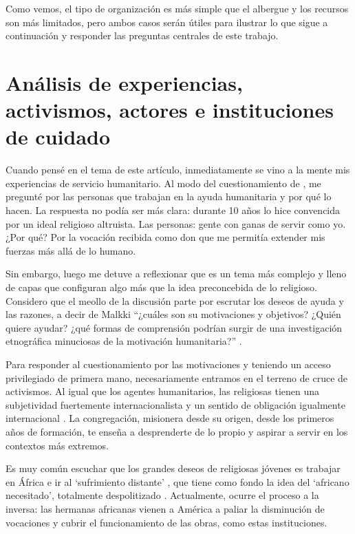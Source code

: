 \documentclass[
  spanish,
  11pt,
  a4paper,
]{scrbook}
\begin{document}
Como vemos, el tipo de organización es más simple que el albergue y los
recursos son más limitados, pero ambos casos serán útiles para ilustrar
lo que sigue a continuación y responder las preguntas centrales de este
trabajo.

\section*{Análisis de experiencias, activismos, actores e instituciones
de
cuidado}\label{anuxe1lisis-de-experiencias-activismos-actores-e-instituciones-de-cuidado}


Cuando pensé en el tema de este artículo, inmediatamente se vino a la
mente mis experiencias de servicio humanitario. Al modo del
cuestionamiento de \textcite{Malkki2015}, me pregunté por las personas
que trabajan en la ayuda humanitaria y por qué lo hacen. La respuesta no
podía ser más clara: durante 10 años lo hice convencida por un ideal
religioso altruista. Las personas: gente con ganas de servir como yo.
¿Por qué? Por la vocación recibida como don que me permitía extender mis
fuerzas más allá de lo humano.

Sin embargo, luego me detuve a reflexionar que es un tema más complejo y
lleno de capas que configuran algo más que la idea preconcebida de lo
religioso. Considero que el meollo de la discusión parte por escrutar
los deseos de ayuda y las razones, a decir de Malkki ``¿cuáles son su
motivaciones y objetivos? ¿Quién quiere ayudar? ¿qué formas de
comprensión podrían surgir de una investigación etnográfica minuciosas
de la motivación humanitaria?'' \autocite[2]{Malkki2015}.

Para responder al cuestionamiento por las motivaciones y teniendo un
acceso privilegiado de primera mano, necesariamente entramos en el
terreno de cruce de activismos. Al igual que los agentes humanitarios,
las religiosas tienen una subjetividad fuertemente internacionalista y
un sentido de obligación igualmente internacional
\autocite[3]{Malkki2015}. La congregación, misionera desde su origen,
desde los primeros años de formación, te enseña a desprenderte de lo
propio y aspirar a servir en los contextos más extremos.

Es muy común escuchar que los grandes deseos de religiosas jóvenes es
trabajar en África e ir al `sufrimiento distante'
\autocite[4]{Redfield2011}, que tiene como fondo la idea del `africano
necesitado', totalmente despolitizado \autocite[8]{Malkki2015}.
Actualmente, ocurre el proceso a la inversa: las hermanas africanas
vienen a América a paliar la disminución de vocaciones y cubrir el
funcionamiento de las obras, como estas instituciones.
\end{document}
